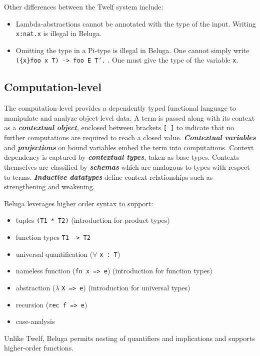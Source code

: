 \documentclass[11pt]{article}
\begin{document}
Other differences between the Twelf system include:
\begin{itemize}
\item Lambda-abstractions cannot be annotated with the type of the input. Writing \texttt{\\x:nat.x} is illegal in Beluga.
\item Omitting the type in a Pi-type is illegal in Beluga. One cannot simply write \texttt{(\{x\}foo x T) -> foo E T'.} . One must give the type of the variable \texttt{x}.
\end{itemize}



\subsection{Computation-level}
The computation-level provides a dependently typed functional language to manipulate and analyze object-level data. A term is passed along with its context as a \textbf{\textit{contextual object}}, enclosed between brackets \texttt{[ ]} to indicate that no further computations are required to reach a closed value. \textbf{\textit{Contextual variables}} and \textbf{\textit{projections}} on bound variables embed the term into computations. Context dependency is captured by \textit{\textbf{contextual types}}, taken as base types. Contexts themselves are classified by \textit{\textbf{schemas}} which are analogous to types with respect to terms. \textit{\textbf{Inductive datatypes}} define context relationships such as strengthening and weakening.

Beluga leverages higher order syntax to support:
\begin{itemize}
\item tuples \texttt{(T1 * T2)} (introduction for product types)
\item function types \texttt{T1 -> T2}
\item universal quantification ($\forall$ \texttt{x : T})
\item nameless function (\texttt{fn x => e}) (introduction for function types)
\item abstraction ($\lambda$ \texttt{X => e}) (introduction for universal types)
\item recursion (\texttt{rec f => e})
\item case-analysis 
\end{itemize}
Unlike Twelf, Beluga permits nesting of quantifiers and implications and supports higher-order functions. 
\end{document}

